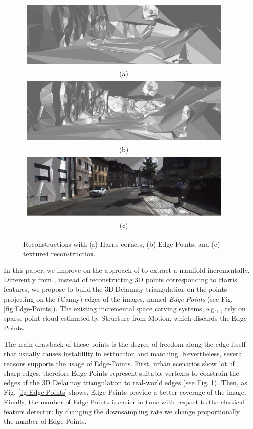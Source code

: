 \begin{figure}
\centering
\begin{tabular}{cc}
\includegraphics[width=0.75\columnwidth]{./img//reconstrHarris}\\
(a)\\
\includegraphics[width=0.75\columnwidth]{./img//reconstr}\\
(b)\\
\includegraphics[width=0.75\columnwidth]{./img//reconstrTex}\\
(c)\\
\end{tabular}
\caption{Reconstructions with (a) Harris corners, (b) Edge-Points, and (c) textured reconstruction.}
\label{fig:recons}
\end{figure}

In this paper, we improve on the approach of \cite{litvinov_lhuillier_13} to extract a manifold incrementally. 
Differently from \cite{litvinov_lhuillier_13}, instead of reconstructing 3D points corresponding to Harris features, we propose to build the 3D Delaunay triangulation on the points projecting on the (Canny) edges of the images, named \emph{Edge-Points} (see Fig. \ref{fig:Edge-Points}). 
The existing incremental space carving systems, e.g., \cite{litvinov_Lhiuller14, litvinov_lhuillier_13, Lovi_et_al_11}, rely on sparse point cloud estimated by Structure from Motion, which discards the Edge-Points.

The main drawback of these points is the degree of freedom along the edge itself that usually causes instability in estimation and matching.
Nevertheless, several reasons supports the usage of Edge-Points.
First, urban scenarios show lot of sharp edges, therefore Edge-Points represent suitable vertexes to constrain the edges of the 3D Delaunay triangulation to real-world edges (see Fig. \ref{fig:recons}). 
Then, as Fig. \ref{fig:Edge-Points} shows, Edge-Points provide a better coverage of the image.
Finally, the number of Edge-Points is easier to tune with respect to the classical feature detector: by changing the downsampling rate we change proportionally the number of Edge-Points.

